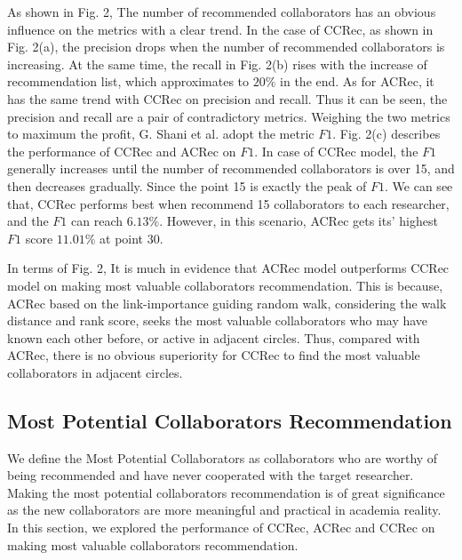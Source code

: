 \documentclass[review]{elsarticle}
\begin{document}
As shown in Fig. 2, The number of recommended collaborators has an obvious influence on the metrics with a clear trend. In the case of CCRec, as shown in Fig. 2(a), the precision drops when the number of recommended collaborators is increasing. At the same time, the recall in Fig. 2(b) rises with the increase of recommendation list, which approximates to $20\%$ in the end. As for ACRec, it has the same trend with CCRec on precision and recall. Thus it can be seen, the precision and recall are a pair of contradictory metrics. Weighing the two metrics to maximum the profit, G. Shani et al. \cite{shani2011evaluating} adopt the metric $F1$. Fig. 2(c) describes the performance of CCRec and ACRec on $F1$. In case of CCRec model, the $F1$ generally increases until the number of recommended collaborators is over 15, and then decreases gradually. Since the point 15 is exactly the peak of $F1$. We can see that, CCRec performs best when recommend 15 collaborators to each researcher, and the $F1$ can reach $6.13\%$. However, in this scenario, ACRec gets its' highest $F1$ score $11.01\%$ at point 30.

In terms of Fig. 2, It is  much in evidence that ACRec model outperforms CCRec model on making most valuable collaborators recommendation. This is because, ACRec based on the link-importance guiding random walk, considering the walk distance and rank score, seeks the most valuable collaborators who may have known each other before, or active in adjacent circles. Thus, compared with ACRec, there is no obvious superiority for CCRec to find the most valuable collaborators in adjacent circles.

\subsection{Most Potential Collaborators Recommendation}
We define the Most Potential Collaborators as collaborators who are worthy of being recommended and have never cooperated with the target researcher. Making the most potential collaborators recommendation is of great significance as the new collaborators are more meaningful and practical in academia reality. In this section, we explored the performance of CCRec, ACRec and CCRec on making most valuable collaborators recommendation.
\end{document}
